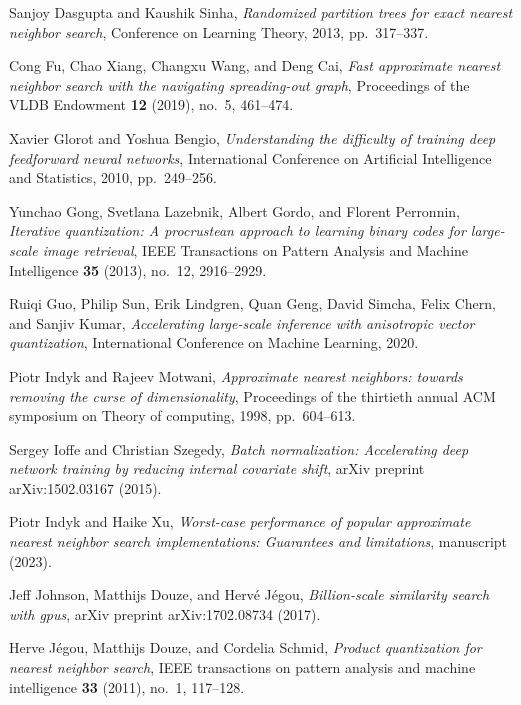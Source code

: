 \documentclass[11pt]{article}
\begin{document}
\begin{thebibliography}{10}
\begin{small}
Sanjoy Dasgupta and Kaushik Sinha, \emph{Randomized partition trees for exact nearest neighbor search}, Conference on Learning Theory, 2013, pp.~317--337.

Cong Fu, Chao Xiang, Changxu Wang, and Deng Cai, \emph{Fast approximate nearest neighbor search with the navigating spreading-out graph}, Proceedings of the VLDB Endowment \textbf{12} (2019), no.~5, 461--474.

Xavier Glorot and Yoshua Bengio, \emph{Understanding the difficulty of training deep feedforward neural networks}, International Conference on Artificial Intelligence and Statistics, 2010, pp.~249--256.

Yunchao Gong, Svetlana Lazebnik, Albert Gordo, and Florent Perronnin, \emph{Iterative quantization: A procrustean approach to learning binary codes for large-scale image retrieval}, IEEE Transactions on Pattern Analysis and Machine Intelligence \textbf{35} (2013), no.~12, 2916--2929.

Ruiqi Guo, Philip Sun, Erik Lindgren, Quan Geng, David Simcha, Felix Chern, and Sanjiv Kumar, \emph{Accelerating large-scale inference with anisotropic vector quantization}, International Conference on Machine Learning, 2020.

Piotr Indyk and Rajeev Motwani, \emph{Approximate nearest neighbors: towards removing the curse of dimensionality}, Proceedings of the thirtieth annual ACM symposium on Theory of computing, 1998, pp.~604--613.

Sergey Ioffe and Christian Szegedy, \emph{Batch normalization: Accelerating deep network training by reducing internal covariate shift}, arXiv preprint arXiv:1502.03167 (2015).

Piotr Indyk and Haike Xu, \emph{Worst-case performance of popular approximate nearest neighbor search implementations: Guarantees and limitations}, manuscript (2023).

Jeff Johnson, Matthijs Douze, and Herv{\'e} J{\'e}gou, \emph{Billion-scale similarity search with gpus}, arXiv preprint arXiv:1702.08734 (2017).

Herve J\'egou, Matthijs Douze, and Cordelia Schmid, \emph{Product quantization for nearest neighbor search}, IEEE transactions on pattern analysis and machine intelligence \textbf{33} (2011), no.~1, 117--128.


\end{small}
\end{thebibliography}
\end{document}
